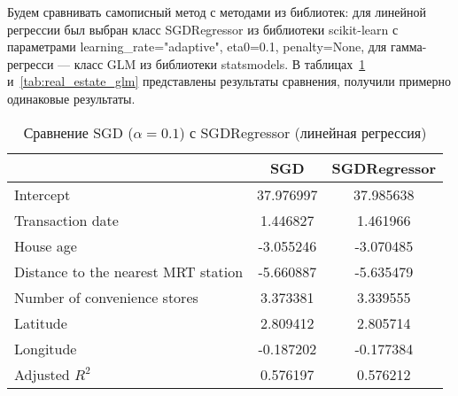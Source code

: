 \documentclass{article}
\begin{document}
Будем сравнивать самописный метод с методами из библиотек: для линейной регрессии был выбран класс \textsf{SGDRegressor} из библиотеки \textsf{scikit-learn} с параметрами \textsf{learning\_rate="adaptive"}, \textsf{eta0=0.1}, \textsf{penalty=None}, для гамма-регресси --- класс \textsf{GLM} из библиотеки \textsf{statsmodels}. В таблицах~\ref{tab:real_estate_lm} и~\ref{tab:real_estate_glm} представлены результаты сравнения, получили примерно одинаковые результаты.
\begin{table}[h]
    \caption{Сравнение \textsf{SGD} ($\alpha=0.1$) с \textsf{SGDRegressor} (линейная регрессия)}
    \centering
    \begin{tabular}{|l|c|c|}
        \hline
                                            & \textsf{SGD} & \textsf{SGDRegressor} \\
        \hline
        Intercept                           & 37.976997    & 37.985638             \\
        Transaction date                    & 1.446827     & 1.461966              \\
        House age                           & -3.055246    & -3.070485             \\
        Distance to the nearest MRT station & -5.660887    & -5.635479             \\
        Number of convenience stores        & 3.373381     & 3.339555              \\
        Latitude                            & 2.809412     & 2.805714              \\
        Longitude                           & -0.187202    & -0.177384             \\
        \hhline{===}
        Adjusted $R^2$                      & 0.576197     & 0.576212              \\
        \hline
    \end{tabular}
    \label{tab:real_estate_lm}
\end{table}
\end{document}
